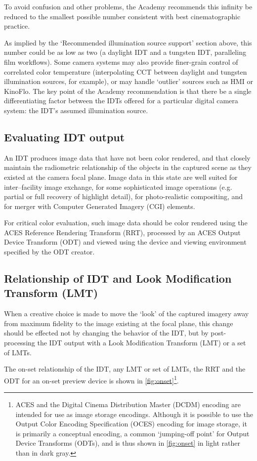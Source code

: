 To avoid confusion and other problems, the Academy recommends this infinity be reduced to the smallest possible number consistent with best cinematographic practice.

As implied by the `Recommended illumination source support' section above, this number could be as low as two (a daylight IDT and a tungsten IDT, paralleling film workflows). Some camera systems may also provide finer-grain control of correlated color temperature (interpolating CCT between daylight and tungsten illumination sources, for example), or may handle `outlier' sources such as HMI or KinoFlo\textsuperscript{\textregistered{}}. The key point of the Academy recommendation is that there be a single differentiating factor between the IDTs offered for a particular digital camera system: the IDT's assumed illumination source.

\subsection{Evaluating IDT output}
An IDT produces image data that have not been color rendered, and that closely maintain the radiometric relationship of the objects in the captured scene as they existed at the camera focal plane. Image data in this state are well suited for inter–facility image exchange, for some sophisticated image operations (e.g. partial or full recovery of highlight detail), for photo-realistic compositing, and for merger with Computer Generated Imagery (CGI) elements.

For critical color evaluation, such image data should be color rendered using the ACES Reference Rendering Transform (RRT), processed by an ACES Output Device Transform (ODT) and viewed using the device and viewing environment specified by the ODT creator. 

\subsection{Relationship of IDT and Look Modification Transform (LMT)}
When a creative choice is made to move the `look' of the captured imagery away from maximum fidelity to the image existing at the focal plane, this change should be effected not by changing the behavior of the IDT, but by post-processing the IDT output with a Look Modification Transform (LMT) or a set of LMTs.

The on-set relationship of the IDT, any LMT or set of LMTs, the RRT and the ODT for an on-set preview device is shown in \autoref{fig:onset}\footnote{ACES and the Digital Cinema Distribution Master (DCDM) encoding are intended for use as image storage encodings. Although it is possible to use the Output Color Encoding Specification (OCES) encoding for image storage, it is primarily a conceptual encoding, a common `jumping-off point' for Output Device Transforms (ODTs), and is thus shown in \autoref{fig:onset} in light rather than in dark gray.}.

